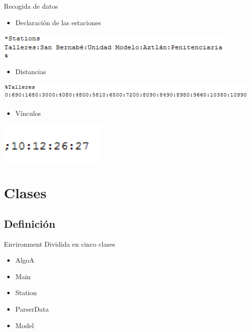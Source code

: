 \documentclass[11pt]{beamer}
\begin{document}
\begin{frame}{Recogida de datos}
\begin{itemize}
\item Declaración de las estaciones
\end{itemize}
\includegraphics[width=0.9\textwidth]{images/datosDecl.png}
\\
\begin{itemize}
\item Distancias
\end{itemize}
\includegraphics[width=1\textwidth]{images/datosDist.png}
\\
\begin{itemize}
\item Vínculos
\end{itemize}
\includegraphics[width=0.4\textwidth]{images/datosVinc.png}
\end{frame}
\section{Clases}
\subsection*{Definici\'on}
\begin{frame}{Environment}
Dividida en cinco clases
\begin{itemize}
\item AlgoA
\item Main
\item Station
\item ParserData
\item Model
\end{itemize}
\end{frame}
\end{document}

